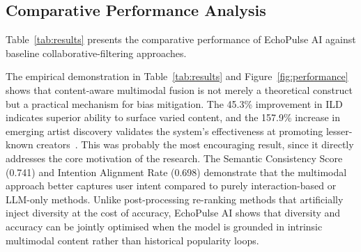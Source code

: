 \documentclass[]{ceurart}
\begin{document}
\subsection{Comparative Performance Analysis}
Table~\ref{tab:results} presents the comparative performance of EchoPulse AI
against baseline collaborative-filtering approaches.

\begin{table}
\caption{Performance comparison between EchoPulse AI and baseline
recommendation methods. Best results in bold. Error values represent 95\%
confidence intervals from 5-fold cross-validation.}
\label{tab:results}
\centering
\renewcommand{\arraystretch}{1.25}
\end{table}

The empirical demonstration in Table~\ref{tab:results} and
Figure~\ref{fig:performance} shows that content-aware multimodal fusion is not
merely a theoretical construct but a practical mechanism for bias mitigation.
The 45.3\% improvement in ILD indicates superior ability to surface varied
content, and the 157.9\% increase in emerging artist discovery validates the
system's effectiveness at promoting lesser-known
creators~\cite{porcaro2021diversity}. This was probably the most encouraging
result, since it directly addresses the core motivation of the research. The
Semantic Consistency Score (0.741) and Intention Alignment Rate (0.698)
demonstrate that the multimodal approach better captures user intent compared
to purely interaction-based or LLM-only methods. Unlike post-processing
re-ranking methods that artificially inject diversity at the cost of accuracy,
EchoPulse AI shows that diversity and accuracy can be jointly optimised when
the model is grounded in intrinsic multimodal content rather than historical
popularity loops.
\end{document}
